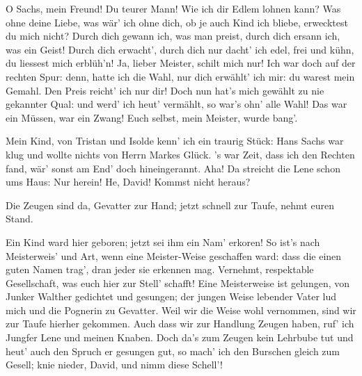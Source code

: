\begin{drama}


\Evaspeaks


O Sachs, mein Freund! Du teurer Mann!
Wie ich dir Edlem lohnen kann?
Was ohne deine Liebe, was wär' ich ohne dich,
ob je auch Kind ich bliebe,
erwecktest du mich nicht?
Durch dich gewann ich,
was man preist,
durch dich ersann ich,
was ein Geist!
Durch dich erwacht',
durch dich nur dacht'
ich edel, frei und kühn,
du liessest mich erblüh'n!
Ja, lieber Meister, schilt mich nur!
Ich war doch auf der rechten Spur:
denn, hatte ich die Wahl,
nur dich erwählt' ich mir:
du warest mein Gemahl.
Den Preis reicht' ich nur dir!
Doch nun hat's mich gewählt
zu nie gekannter Qual:
und werd' ich heut' vermählt,
so war's ohn' alle Wahl!
Das war ein Müssen, war ein Zwang!
Euch selbst, mein Meister, wurde bang'.

\Sachsspeaks
Mein Kind, von Tristan und Isolde
kenn' ich ein traurig Stück:
Hans Sachs war klug und wollte
nichts von Herrn Markes Glück.
's war Zeit, dass ich den Rechten fand,
wär' sonst am End' doch hineingerannt.
Aha! Da streicht die Lene schon ums Haus:
Nur herein! He, David! Kommst nicht heraus?


Die Zeugen sind da, Gevatter zur Hand;
jetzt schnell zur Taufe, nehmt euren Stand.


Ein Kind ward hier geboren;
jetzt sei ihm ein Nam' erkoren!
So ist's nach Meisterweis' und Art,
wenn eine Meister-Weise geschaffen ward:
dass die einen guten Namen trag',
dran jeder sie erkennen mag.
Vernehmt, respektable Gesellschaft,
was euch hier zur Stell' schafft!
Eine Meisterweise ist gelungen,
von Junker Walther gedichtet und gesungen;
der jungen Weise lebender Vater
lud mich und die Pognerin zu Gevatter.
Weil wir die Weise wohl vernommen,
sind wir zur Taufe hierher gekommen.
Auch dass wir zur Handlung Zeugen haben,
ruf' ich Jungfer Lene und meinen Knaben.
Doch da's zum Zeugen kein Lehrbube tut
und heut' auch den Spruch er gesungen gut,
so mach' ich den Burschen gleich zum Gesell;
knie nieder, David, und nimm diese Schell'!



\end{drama}

